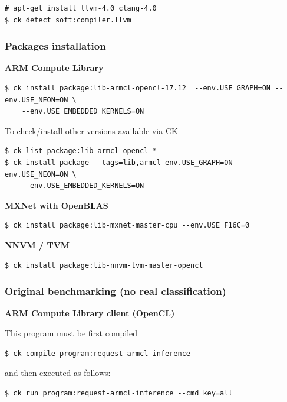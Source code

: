\documentclass[sigplan]{acmart}
\begin{document}
\begin{verbatim}
# apt-get install llvm-4.0 clang-4.0
$ ck detect soft:compiler.llvm 
\end{verbatim}

\subsubsection{Packages installation}

\textbf{ARM Compute Library}

\begin{verbatim}
$ ck install package:lib-armcl-opencl-17.12  --env.USE_GRAPH=ON --env.USE_NEON=ON \
    --env.USE_EMBEDDED_KERNELS=ON 
\end{verbatim}

To check/install other versions available via CK 

\begin{verbatim}
$ ck list package:lib-armcl-opencl-* 
$ ck install package --tags=lib,armcl env.USE_GRAPH=ON --env.USE_NEON=ON \
    --env.USE_EMBEDDED_KERNELS=ON 
\end{verbatim}

\textbf{MXNet with OpenBLAS}

\begin{verbatim}
$ ck install package:lib-mxnet-master-cpu --env.USE_F16C=0
\end{verbatim}

\textbf{NNVM / TVM}

\begin{verbatim}
$ ck install package:lib-nnvm-tvm-master-opencl 
\end{verbatim}

\subsubsection{Original benchmarking (no real classification)}

\textbf{ARM Compute Library client (OpenCL)}

This program must be first compiled

\begin{verbatim}
$ ck compile program:request-armcl-inference 
\end{verbatim}

and then executed as follows:

\begin{verbatim}
$ ck run program:request-armcl-inference --cmd_key=all
\end{verbatim}
\end{document}
